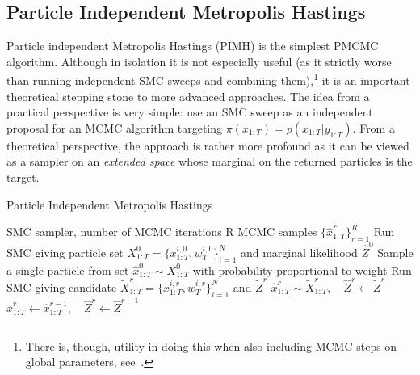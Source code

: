 \subsection{Particle Independent Metropolis Hastings}
\label{sec:part:pmcmc:pimh}

Particle independent Metropolis Hastings (PIMH) is the simplest PMCMC algorithm.  Although in isolation it is
not especially useful (as it strictly worse than running independent SMC sweeps and combining 
them),\footnote{There is, though, utility in doing this when also including MCMC steps on global parameters, see~\cite{andrieu2010particle}.}
 it is an
important theoretical stepping stone to more advanced approaches.  The idea from a practical perspective 
is very simple: use an SMC sweep as an independent proposal for an MCMC algorithm targeting $\pi(x_{1:T}) = p(x_{1:T}|y_{1:T})$.
From a theoretical perspective, the approach is rather more profound as it can be viewed as a sampler on 
an \emph{extended space} whose marginal on the returned particles is the target.  

\begin{algorithm}[tb]
	\caption{Particle Independent Metropolis Hastings}
	\label{alg:part:pimh}
	\begin{spacing}{1.2}
		\begin{algorithmic}[1]
			\renewcommand{\algorithmicrequire}{\textbf{Inputs:}}
			\renewcommand{\algorithmicensure}{\textbf{Outputs:}}				 
			\Require SMC sampler, number of MCMC iterations R
			\Ensure MCMC samples $\{\hat{x}_{1:T}^r\}_{r=1}^R$
			\State Run SMC giving particle set $X_{1:T}^0 = \{x_{1:T}^{i,0},w_T^{i,0}\}_{i=1}^N$ and marginal likelihood $\hat{Z}^0$
			\State Sample a single particle from set $\hat{x}_{1:T}^0 \sim X_{1:T}^0$ with probability proportional to weight
			\State Run SMC giving candidate $\tilde{X}_{1:T}^r = \{x_{1:T}^{i,r},w_T^{i,r}\}_{i=1}^N$
				 and $\tilde{Z}^r$
			\State $\hat{x}_{1:T}^r \sim \tilde{X}_{1:T}^r, \quad \hat{Z}^{r} \leftarrow \tilde{Z}^r$
			\Else
			\State $\hat{x}_{1:T}^r \leftarrow \hat{x}_{1:T}^{r-1}, \quad \hat{Z}^{r} \leftarrow \hat{Z}^{r-1}$
			\EndIf
			\EndFor
		\end{algorithmic}
	\end{spacing}
\end{algorithm}

